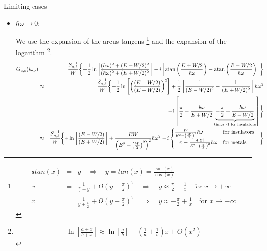 \documentclass[11pt,a4paper]{report}
\begin{document}
Limiting cases
\begin{itemize}
\item $\hbar\omega\rightarrow 0$:

We use the expansion of the arcus tangens
\footnote{
\begin{eqnarray}
  atan(x)&=&y\quad\Rightarrow\quad y=tan(x)=\frac{\sin(x)}{\cos(x)}
\nonumber\\
x&=&\frac{1}{\frac{\pi}{2}-y}+O(y-\frac{\pi}{2})^2
\quad\Rightarrow\quad 
y\approx\frac{\pi}{2}-\frac{1}{x}\quad\text{for $x\rightarrow+\infty$}
\nonumber\\
x&=&\frac{1}{y+\frac{\pi}{2}}+O(y+\frac{\pi}{2})^2
\quad\Rightarrow\quad 
y\approx-\frac{\pi}{2}+\frac{1}{x}\quad\text{for $x\rightarrow-\infty$}
\end{eqnarray}
} and the expansion of the logarithm
\footnote{
\begin{eqnarray}
\ln\left[\frac{a+x}{b+x}\right]\approx
\ln\left[\frac{a}{b}\right]+\left(\frac{1}{a}+\frac{1}{b}\right)x+O(x^2)
\end{eqnarray}
}.
\begin{eqnarray}
G_{a,b}(i\omega_\nu)&=&
\frac{S^{-1}_{a,b}}{W}
\biggl\lbrace
+\frac{1}{2}\ln\left[
\frac{(\hbar\omega)^2+(E-W/2)^2}{(\hbar\omega)^2+(E+W/2)^2}
\right]
-i \left[\atan\left(\frac{E+W/2}{\hbar\omega}\right)
-\atan\left(\frac{E-W/2}{\hbar\omega}\right)\right]
\biggr\rbrace
\nonumber\\
%
&\approx&
\frac{S^{-1}_{a,b}}{W}
\biggl\lbrace
+\frac{1}{2}\ln\left[\left(
\frac{(E-W/2)}{(E+W/2)}\right)^2
\right]
+\frac{1}{2}\left[\frac{1}{(E-W/2)^2}-\frac{1}{(E+W/2)^2}\right]\hbar\omega^2
\nonumber\\
&&-i \left[\frac{\pi}{2}-\frac{\hbar\omega}{E+W/2}
\underbrace{
-\frac{\pi}{2}+\frac{\hbar\omega}{E-W/2}
}_{\text{times -1 for insulators}}\right]
\biggr\rbrace
\nonumber\\
%
&\approx&
\frac{S^{-1}_{a,b}}{W}
\biggl\lbrace
+\ln\left[
\frac{(E-W/2)}{(E+W/2)}
\right]
+\frac{EW}{\left(E^2-\left(\frac{W}{2}\right)^2\right)^2}\hbar\omega^2
-i 
\begin{cases}
\frac{W}{E^2-\left(\frac{W}{2}\right)^2}\hbar\omega
&\text{for insulators}\\
\pm\pi-\frac{4|E|}{E^2-\left(\frac{W}{2}\right)^2}\hbar\omega
&\text{for metals}\\
\end{cases}
\hspace{0.3cm}\biggr\rbrace
\nonumber\\
\end{eqnarray}

\end{itemize}
\end{document}
